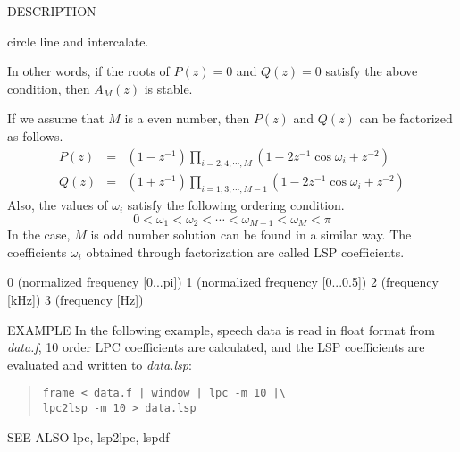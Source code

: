 \begin{qsection}{DESCRIPTION}
\begin{itemize}
      circle line and intercalate.
\end{itemize}
In other words, if  the roots of $P(z)=0$ and $Q(z)=0$ satisfy the
above condition, then $A_M(z)$ is stable.
\par
If we assume that $M$ is a even number, then
$P(z)$ and $Q(z)$ can be factorized as follows.
\begin{eqnarray*}
  P(z) &=& ( 1 - z^{-1} ) \prod_{i=2,4,\cdots,M}
           ( 1 - 2 z^{-1} \cos \omega_i + z^{-2} ) \\
  Q(z) &=& ( 1 + z^{-1} ) \prod_{i=1,3,\cdots,M-1}
           ( 1 - 2 z^{-1} \cos \omega_i + z^{-2} )
\end{eqnarray*}
Also, the values of $\omega_i$ satisfy the following ordering condition.
\begin{displaymath}
  0 < \omega_1 < \omega_2 < \cdots < \omega_{M-1} < \omega_M < \pi
\end{displaymath}
In the case, $M$ is odd number solution can be found in a similar way.
The coefficients $\omega_i$ obtained through factorization are called
LSP coefficients.
\end{qsection}

\begin{options}
                 0 (normalized frequency [0...pi])
                 1 (normalized frequency [0...0.5])
                 2 (frequency [kHz])
                 3 (frequency [Hz])
\end{options}

\begin{qsection}{EXAMPLE}
In the following example, speech data is read in float format from
{\em data.f}, 10 order LPC coefficients are calculated,
and the LSP coefficients are evaluated and written to {\em data.lsp}:
\begin{quote}
\verb!frame < data.f | window | lpc -m 10 |\!\\
\verb!lpc2lsp -m 10 > data.lsp!
\end{quote}
\end{qsection}

\begin{qsection}{SEE ALSO}
lpc, lsp2lpc, lspdf
\end{qsection}
